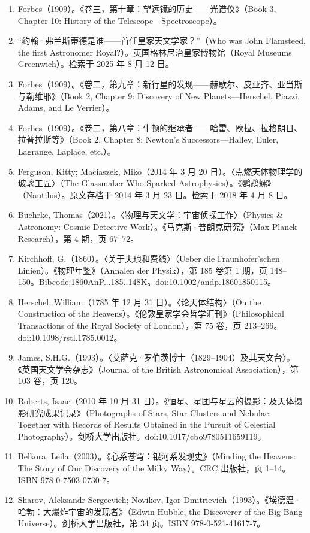 \begin{enumerate}
  \item Forbes（1909）。《卷三，第十章：望远镜的历史——光谱仪》（Book 3, Chapter 10: History of the Telescope—Spectroscope）。
  \item “约翰·弗兰斯蒂德是谁——首任皇家天文学家？”（Who was John Flamsteed, the first Astronomer Royal?）。英国格林尼治皇家博物馆（Royal Museums Greenwich）。检索于 2025 年 8 月 12 日。
  \item Forbes（1909）。《卷二，第九章：新行星的发现——赫歇尔、皮亚齐、亚当斯与勒维耶》（Book 2, Chapter 9: Discovery of New Planets—Herschel, Piazzi, Adams, and Le Verrier）。
  \item Forbes（1909）。《卷二，第八章：牛顿的继承者——哈雷、欧拉、拉格朗日、拉普拉斯等》（Book 2, Chapter 8: Newton’s Successors—Halley, Euler, Lagrange, Laplace, etc.）。
  \item Ferguson, Kitty; Maciaszek, Miko（2014 年 3 月 20 日）。〈点燃天体物理学的玻璃工匠〉（The Glassmaker Who Sparked Astrophysics）。《鹦鹉螺》（Nautilus）。原文存档于 2014 年 3 月 23 日。检索于 2018 年 4 月 8 日。
  \item Buehrke, Thomas（2021）。〈物理与天文学：宇宙侦探工作〉（Physics \& Astronomy: Cosmic Detective Work）。《马克斯·普朗克研究》（Max Planck Research），第 4 期，页 67–72。
  \item Kirchhoff, G.（1860）。〈关于夫琅和费线〉（Ueber die Fraunhofer’schen Linien）。《物理年鉴》（Annalen der Physik），第 185 卷第 1 期，页 148–150。Bibcode:1860AnP...185..148K。doi:10.1002/andp.18601850115。
  \item Herschel, William（1785 年 12 月 31 日）。〈论天体结构〉（On the Construction of the Heavens）。《伦敦皇家学会哲学汇刊》（Philosophical Transactions of the Royal Society of London），第 75 卷，页 213–266。doi:10.1098/rstl.1785.0012。
  \item James, S.H.G.（1993）。〈艾萨克·罗伯茨博士（1829–1904）及其天文台〉。《英国天文学会杂志》（Journal of the British Astronomical Association），第 103 卷，页 120。
  \item Roberts, Isaac（2010 年 10 月 31 日）。《恒星、星团与星云的摄影：及天体摄影研究成果记录》（Photographs of Stars, Star-Clusters and Nebulae: Together with Records of Results Obtained in the Pursuit of Celestial Photography）。剑桥大学出版社。doi:10.1017/cbo9780511659119。
  \item Belkora, Leila（2003）。《心系苍穹：银河系发现史》（Minding the Heavens: The Story of Our Discovery of the Milky Way）。CRC 出版社，页 1–14。ISBN 978-0-7503-0730-7。
  \item Sharov, Aleksandr Sergeevich; Novikov, Igor Dmitrievich（1993）。《埃德温·哈勃：大爆炸宇宙的发现者》（Edwin Hubble, the Discoverer of the Big Bang Universe）。剑桥大学出版社，第 34 页。ISBN 978-0-521-41617-7。

\end{enumerate}
